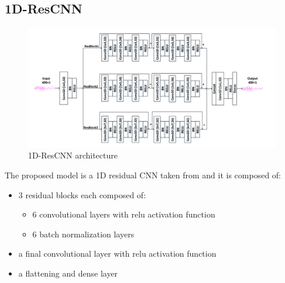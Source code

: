 \documentclass[a4paper]{sapthesis}
\begin{document}
\subsection{1D-ResCNN}\label{sec:1D-ResCNN}
\begin{figure}[h!]
  \centering
  \includegraphics[width=1\linewidth]{model_architecture_Res_CNN.png}
  \caption{1D-ResCNN architecture}
  \end{figure}
The proposed model is a 1D residual CNN taken from\cite{1DResCNN}
 and it is composed of:
\begin{itemize}
\item 3 residual blocks each composed of:
\begin{itemize}
\item 6 convolutional layers with relu activation function
\item 6 batch normalization layers
\end{itemize}
\item a final convolutional layer with relu activation function
\item a flattening and dense layer 
\end{itemize}
\end{document}
